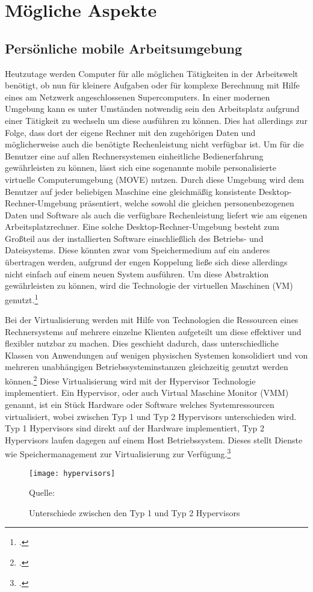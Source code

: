 \newpage
\section{Mögliche Aspekte}
\subsection{Persönliche mobile Arbeitsumgebung}
Heutzutage werden Computer für alle möglichen Tätigkeiten in der Arbeitswelt benötigt, ob nun für kleinere Aufgaben oder für komplexe Berechnung mit Hilfe eines am Netzwerk angeschlossenen Supercomputers. In einer modernen Umgebung kann es unter Umständen notwendig sein den Arbeitsplatz aufgrund einer Tätigkeit zu wechseln um diese ausführen zu können. Dies hat allerdings zur Folge, dass dort der eigene Rechner mit den zugehörigen Daten und möglicherweise auch die benötigte Rechenleistung nicht verfügbar ist.
Um für die Benutzer eine auf allen Rechnersystemen einheitliche Bedienerfahrung gewährleisten zu können, lässt sich eine sogenannte mobile personalisierte virtuelle Computerumgebung (MOVE) nutzen. Durch diese Umgebung wird dem Benutzer auf jeder beliebigen Maschine eine gleichmäßig konsistente Desktop-Rechner-Umgebung präsentiert, welche sowohl die gleichen personenbezogenen Daten und Software als auch die verfügbare Rechenleistung liefert wie am eigenen Arbeitsplatzrechner. Eine solche Desktop-Rechner-Umgebung besteht zum Großteil aus der installierten Software einschließlich des Betriebs- und Dateisystems. Diese könnten zwar vom Speichermedium auf ein anderes übertragen werden, aufgrund der engen Koppelung ließe sich diese allerdings nicht einfach auf einem neuen System ausführen. Um diese Abstraktion gewährleisten zu können, wird die Technologie der virtuellen Maschinen (VM) genutzt.\footcite[Vgl.][Seite 890 f.]{MOVE}

Bei der Virtualisierung werden mit Hilfe von Technologien die Ressourcen eines Rechnersystems auf mehrere einzelne Klienten aufgeteilt um diese effektiver und flexibler nutzbar zu machen. Dies geschieht dadurch, dass unterschiedliche Klassen von Anwendungen auf wenigen physischen Systemen konsolidiert und von mehreren unabhängigen Betriebssysteminstanzen gleichzeitig genutzt werden können.\footcite[Vgl.][Seite 197]{InformatikSpektrum} Diese Virtualisierung wird mit der Hypervisor Technologie implementiert. Ein Hypervisor, oder auch Virtual Maschine Monitor (VMM) genannt, ist ein Stück Hardware oder Software welches Systemressourcen virtualisiert, wobei zwischen Typ 1 und Typ 2 Hypervisors unterschieden wird. Typ 1 Hypervisors sind direkt auf der Hardware implementiert, Typ 2 Hypervisors laufen dagegen auf einem Host Betriebssystem. Dieses stellt Dienste wie Speichermanagement zur Virtualisierung zur Verfügung.\footcite[Vgl.][]{ibm}

\begin{figure}[H]
\begin{center}
\texttt{[image: hypervisors]}
\caption{Unterschiede zwischen den Typ 1 und Typ 2 Hypervisors}
Quelle: \cite[]{ibm}
\end{center}
\end{figure}
\vspace{-1cm}